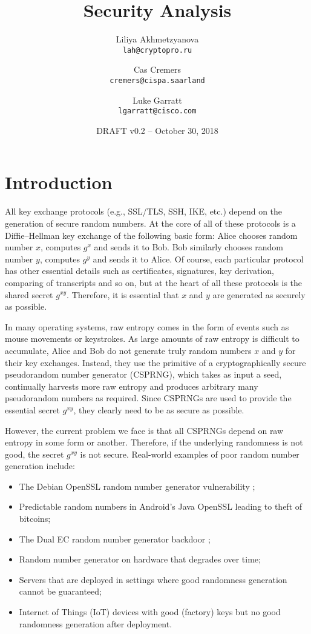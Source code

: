 \documentclass[12pt]{article}
\author{
  Liliya Akhmetzyanova\\
  \texttt{lah@cryptopro.ru}
  \and
  Cas Cremers\\
  \texttt{cremers@cispa.saarland}
  \and
  Luke Garratt\\
  \texttt{lgarratt@cisco.com}
}
\title{Security Analysis}
\date{DRAFT v0.2 -- October 30, 2018}
\begin{document}
  \maketitle


\section{Introduction}
All key exchange protocols (e.g., SSL/TLS, SSH, IKE, etc.) depend on the generation of secure random numbers. At the core of all of these protocols is a Diffie--Hellman key exchange of the following basic form: Alice chooses random number $x$, computes $g^x$ and sends it to Bob. Bob similarly chooses random number $y$, computes $g^y$ and sends it to Alice. Of course, each particular protocol has other essential details such as certificates, signatures, key derivation, comparing of transcripts and so on, but at the heart of all these protocols is the shared secret $g^{xy}$. Therefore, it is essential that $x$ and $y$ are generated as securely as possible. 

In many operating systems, raw entropy comes in the form of events such as mouse movements or keystrokes. As large amounts of raw entropy is difficult to accumulate, Alice and Bob do not generate truly random numbers $x$ and $y$ for their key exchanges. Instead, they use the primitive of a cryptographically secure pseudorandom number generator (CSPRNG), which takes as input a seed, continually harvests more raw entropy and  produces arbitrary many pseudorandom numbers as required. Since CSPRNGs are used to provide the essential secret $g^{xy}$, they clearly need to be as secure as possible. 

However, the current problem we face is that all CSPRNGs depend on raw entropy in some form or another. Therefore, if the underlying randomness is not good, the secret $g^{xy}$ is not secure. Real-world examples of poor random number generation include:

\begin{itemize}
\item The Debian OpenSSL random number generator vulnerability \cite{DebianRNGflaw, DebianRNGflawTLSDHE};

\item Predictable random numbers in Android's Java OpenSSL \cite{MarvinGoogle2013} leading to theft of bitcoins;

\item The Dual EC random number generator backdoor \cite{DualECstandardisedbackdoor};

\item Random number generator on hardware that degrades over time;

\item Servers that are deployed in settings where good randomness generation cannot be guaranteed;

\item Internet of Things (IoT) devices with good (factory) keys but no good randomness generation after deployment.
\end{itemize}
\end{document}
